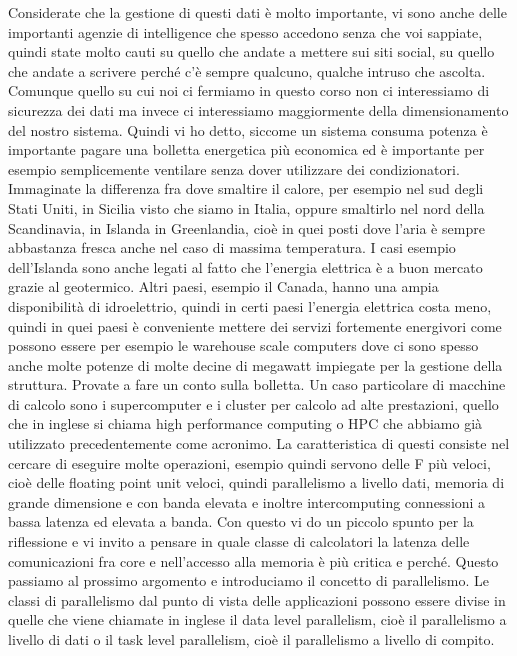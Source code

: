 Considerate che la gestione di questi dati è molto importante, vi sono anche delle importanti agenzie di intelligence che spesso accedono senza che voi sappiate, quindi state molto cauti su quello che andate a mettere sui siti social, su quello che andate a scrivere perché c'è sempre qualcuno, qualche intruso che ascolta.
Comunque quello su cui noi ci fermiamo in questo corso non ci interessiamo di sicurezza dei dati ma invece ci interessiamo maggiormente della dimensionamento del nostro sistema.
Quindi vi ho detto, siccome un sistema consuma potenza è importante pagare una bolletta energetica più economica ed è importante per esempio semplicemente ventilare senza dover utilizzare dei condizionatori.
Immaginate la differenza fra dove smaltire il calore, per esempio nel sud degli Stati Uniti, in Sicilia visto che siamo in Italia, oppure smaltirlo nel nord della Scandinavia, in Islanda in Greenlandia, cioè in quei posti dove l'aria è sempre abbastanza fresca anche nel caso di massima temperatura.
I casi esempio dell'Islanda sono anche legati al fatto che l'energia elettrica è a buon mercato grazie al geotermico.
Altri paesi, esempio il Canada, hanno una ampia disponibilità di idroelettrio, quindi in certi paesi l'energia elettrica costa meno, quindi in quei paesi è conveniente mettere dei servizi fortemente energivori come possono essere per esempio le warehouse scale computers dove ci sono spesso anche molte potenze di molte decine di megawatt impiegate per la gestione della struttura.
Provate a fare un conto sulla bolletta.
Un caso particolare di macchine di calcolo sono i supercomputer e i cluster per calcolo ad alte prestazioni, quello che in inglese si chiama high performance computing o HPC che abbiamo già utilizzato precedentemente come acronimo.
La caratteristica di questi consiste nel cercare di eseguire molte operazioni, esempio quindi servono delle F più veloci, cioè delle floating point unit veloci, quindi parallelismo a livello dati, memoria di grande dimensione e con banda elevata e inoltre intercomputing connessioni a bassa latenza ed elevata a banda.
Con questo vi do un piccolo spunto per la riflessione e vi invito a pensare in quale classe di calcolatori la latenza delle comunicazioni fra core e nell'accesso alla memoria è più critica e perché.
Questo passiamo al prossimo argomento e introduciamo il concetto di parallelismo.
Le classi di parallelismo dal punto di vista delle applicazioni possono essere divise in quelle che viene chiamate in inglese il data level parallelism, cioè il parallelismo a livello di dati o il task level parallelism, cioè il parallelismo a livello di compito.
